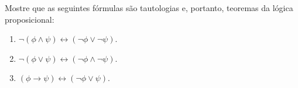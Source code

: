 \begin{exercise}
    Mostre que as seguintes fórmulas são tautologias e, portanto, teoremas da lógica proposicional:
    \begin{enumerate}[label=(\alph*)]
        \item $\neg(\phi\land\psi)\leftrightarrow(\neg\phi\lor\neg\psi)$.
        \item $\neg(\phi\lor\psi)\leftrightarrow(\neg\phi\land\neg\psi)$.
        \item $(\phi\rightarrow\psi)\leftrightarrow(\neg\phi\lor\psi)$.
    \end{enumerate}
\end{exercise}
